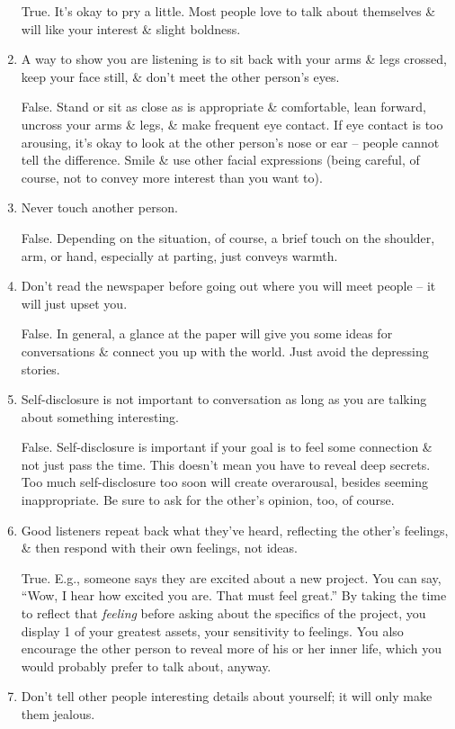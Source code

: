 \documentclass{article}
\numberwithin{equation}{section}
\begin{document}
\begin{enumerate}
	True. It's okay to pry a little. Most people love to talk about themselves \& will like your interest \& slight boldness.
	\item A way to show you are listening is to sit back with your arms \& legs crossed, keep your face still, \& don't meet the other person's eyes.
	
	False. Stand or sit as close as is appropriate \& comfortable, lean forward, uncross your arms \& legs, \& make frequent eye contact. If eye contact is too arousing, it's okay to look at the other person's nose or ear -- people cannot tell the difference. Smile \& use other facial expressions (being careful, of course, not to convey more interest than you want to).
	\item Never touch another person.
	
	False. Depending on the situation, of course, a brief touch on the shoulder, arm, or hand, especially at parting, just conveys warmth.
	\item Don't read the newspaper before going out where you will meet people -- it will just upset you.
	
	False. In general, a glance at the paper will give you some ideas for conversations \& connect you up with the world. Just avoid the depressing stories.
	\item Self-disclosure is not important to conversation as long as you are talking about something interesting.
	
	False. Self-disclosure is important if your goal is to feel some connection \& not just pass the time. This doesn't mean you have to reveal deep secrets. Too much self-disclosure too soon will create overarousal, besides seeming inappropriate. Be sure to ask for the other's opinion, too, of course.
	\item Good listeners repeat back what they've heard, reflecting the other's feelings, \& then respond with their own feelings, not ideas.
	
	True. E.g., someone says they are excited about a new project. You can say, ``Wow, I hear how excited you are. That must feel great.'' By taking the time to reflect that \textit{feeling} before asking about the specifics of the project, you display 1 of your greatest assets, your sensitivity to feelings. You also encourage the other person to reveal more of his or her inner life, which you would probably prefer to talk about, anyway.
	\item Don't tell other people interesting details about yourself; it will only make them jealous.
	

\end{enumerate}
\end{document}
